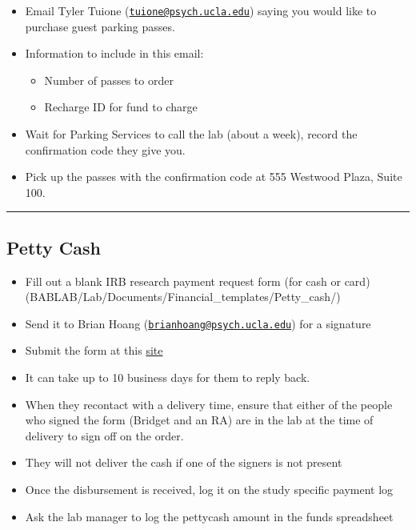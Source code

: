 \documentclass[]{book}
\providecommand{\tightlist}{%
  \setlength{\itemsep}{0pt}\setlength{\parskip}{0pt}}
\begin{document}
\begin{itemize}
\tightlist
\item
  Email Tyler Tuione (\href{mailto:tuione@psych.ucla.edu}{\nolinkurl{tuione@psych.ucla.edu}}) saying you would like to purchase guest parking passes.
\item
  Information to include in this email:

  \begin{itemize}
  \tightlist
  \item
    Number of passes to order
  \item
    Recharge ID for fund to charge
  \end{itemize}
\item
  Wait for Parking Services to call the lab (about a week), record the confirmation code they give you.
\item
  Pick up the passes with the confirmation code at 555 Westwood Plaza, Suite 100.
\end{itemize}

\begin{center}\rule{0.5\linewidth}{0.5pt}\end{center}

\hypertarget{petty-cash}{%
\subsection{Petty Cash}\label{petty-cash}}

\begin{itemize}
\tightlist
\item
  Fill out a blank IRB research payment request form (for cash or card)(BABLAB/Lab/Documents/Financial\_templates/Petty\_cash/)
\item
  Send it to Brian Hoang (\href{mailto:brianhoang@psych.ucla.edu}{\nolinkurl{brianhoang@psych.ucla.edu}}) for a signature
\item
  Submit the form at this \href{https://sa.ucla.edu/MessageCenter/OneStop/Home/PostMessage?topicId=293}{site}
\item
  It can take up to 10 business days for them to reply back.
\item
  When they recontact with a delivery time, ensure that either of the people who signed the form (Bridget and an RA) are in the lab at the time of delivery to sign off on the order.
\item
  They will not deliver the cash if one of the signers is not present
\item
  Once the disbursement is received, log it on the study specific payment log
\item
  Ask the lab manager to log the pettycash amount in the funds spreadsheet
\end{itemize}
\end{document}
